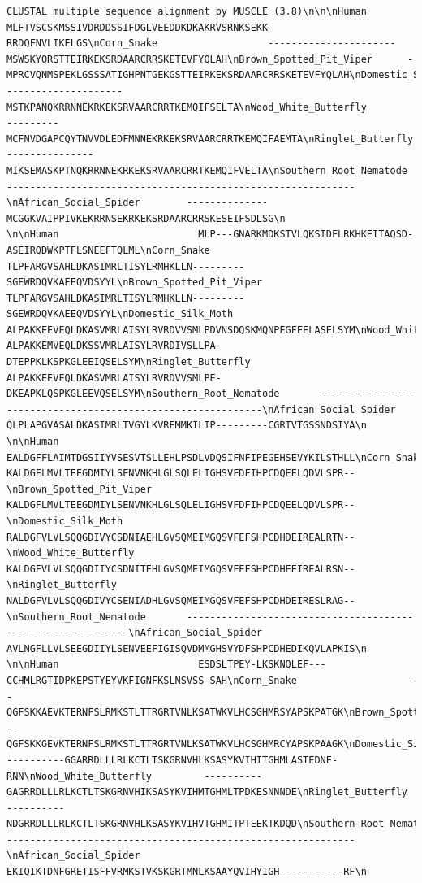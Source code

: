 \documentclass[
  letterpaper,
  DIV=11,
  numbers=noendperiod]{scrartcl}
\begin{document}
\begin{verbatim}
CLUSTAL multiple sequence alignment by MUSCLE (3.8)\n\n\nHuman                        MLFTVSCSKMSSIVDRDDSSIFDGLVEEDDKDKAKRVSRNKSEKK-RRDQFNVLIKELGS\nCorn_Snake                   ----------------------MSWSKYQRSTTEIRKEKSRDAARCRRSKETEVFYQLAH\nBrown_Spotted_Pit_Viper      -MPRCVQNMSPEKLGSSSATIGHPNTGEKGSTTEIRKEKSRDAARCRRSKETEVFYQLAH\nDomestic_Silk_Moth           --------------------MSTKPANQKRRNNEKRKEKSRVAARCRRTKEMQIFSELTA\nWood_White_Butterfly         ---------MCFNVDGAPCQYTNVVDLEDFMNNEKRKEKSRVAARCRRTKEMQIFAEMTA\nRinglet_Butterfly            ---------------MIKSEMASKPTNQKRRNNEKRKEKSRVAARCRRTKEMQIFVELTA\nSouthern_Root_Nematode       ------------------------------------------------------------\nAfrican_Social_Spider        --------------MCGGKVAIPPIVKEKRRNSEKRKEKSRDAARCRRSKESEIFSDLSG\n                                                                                         \n\nHuman                        MLP---GNARKMDKSTVLQKSIDFLRKHKEITAQSD-ASEIRQDWKPTFLSNEEFTQLML\nCorn_Snake                   TLPFARGVSAHLDKASIMRLTISYLRMHKLLN---------SGEWRDQVKAEEQVDSYYL\nBrown_Spotted_Pit_Viper      TLPFARGVSAHLDKASIMRLTISYLRMHKLLN---------SGEWRDQVKAEEQVDSYYL\nDomestic_Silk_Moth           ALPAKKEEVEQLDKASVMRLAISYLRVRDVVSMLPDVNSDQSKMQNPEGFEELASELSYM\nWood_White_Butterfly         ALPAKKEMVEQLDKSSVMRLAISYLRVRDIVSLLPA-DTEPPKLKSPKGLEEIQSELSYM\nRinglet_Butterfly            ALPAKKEEVEQLDKASVMRLAISYLRVRDVVSMLPE-DKEAPKLQSPKGLEEVQSELSYM\nSouthern_Root_Nematode       ------------------------------------------------------------\nAfrican_Social_Spider        QLPLAPGVASALDKASIMRLTVGYLKVREMMKILIP---------CGRTVTGSSNDSIYA\n                                                                                         \n\nHuman                        EALDGFFLAIMTDGSIIYVSESVTSLLEHLPSDLVDQSIFNFIPEGEHSEVYKILSTHLL\nCorn_Snake                   KALDGFLMVLTEEGDMIYLSENVNKHLGLSQLELIGHSVFDFIHPCDQEELQDVLSPR--\nBrown_Spotted_Pit_Viper      KALDGFLMVLTEEGDMIYLSENVNKHLGLSQLELIGHSVFDFIHPCDQEELQDVLSPR--\nDomestic_Silk_Moth           RALDGFVLVLSQQGDIVYCSDNIAEHLGVSQMEIMGQSVFEFSHPCDHDEIREALRTN--\nWood_White_Butterfly         KALDGFVLVLSQQGDIIYCSDNITEHLGVSQMEIMGQSVFEFSHPCDHEEIREALRSN--\nRinglet_Butterfly            NALDGFVLVLSQQGDIVYCSENIADHLGVSQMEIMGQSVFEFSHPCDHDEIRESLRAG--\nSouthern_Root_Nematode       ------------------------------------------------------------\nAfrican_Social_Spider        AVLNGFLLVLSEEGDIIYLSENVEEFIGISQVDMMGHSVYDFSHPCDHEDIKQVLAPKIS\n                                                                                         \n\nHuman                        ESDSLTPEY-LKSKNQLEF---CCHMLRGTIDPKEPSTYEYVKFIGNFKSLNSVSS-SAH\nCorn_Snake                   --QGFSKKAEVKTERNFSLRMKSTLTTRGRTVNLKSATWKVLHCSGHMRSYAPSKPATGK\nBrown_Spotted_Pit_Viper      --QGFSKKGEVKTERNFSLRMKSTLTTRGRTVNLKSATWKVLHCSGHMRCYAPSKPAAGK\nDomestic_Silk_Moth           ----------GGARRDLLLRLKCTLTSKGRNVHLKSASYKVIHITGHMLASTEDNE-RNN\nWood_White_Butterfly         ----------GAGRRDLLLRLKCTLTSKGRNVHIKSASYKVIHMTGHMLTPDKESNNNDE\nRinglet_Butterfly            ----------NDGRRDLLLRLKCTLTSKGRNVHLKSASYKVIHVTGHMITPTEEKTKDQD\nSouthern_Root_Nematode       ------------------------------------------------------------\nAfrican_Social_Spider        EKIQIKTDNFGRETISFFVRMKSTVKSKGRTMNLKSAAYQVIHYIGH-----------RF\n       
\end{verbatim}
\end{document}
